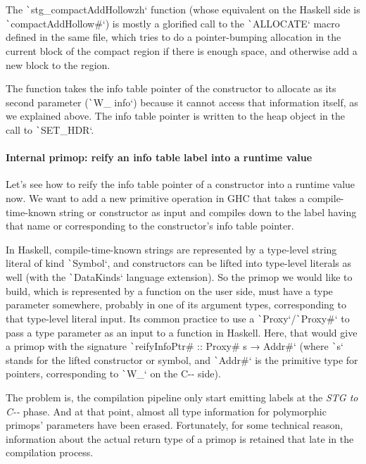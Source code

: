 \documentclass[english]{jflart}
\begin{document}
The \texttt`stg_compactAddHollowzh` function (whose equivalent on the Haskell side is \texttt`compactAddHollow#`) is mostly a glorified call to the \texttt`ALLOCATE` macro defined in the same file, which tries to do a pointer-bumping allocation in the current block of the compact region if there is enough space, and otherwise add a new block to the region.

The function takes the info table pointer of the constructor to allocate as its second parameter (\texttt`W_ info`) because it cannot access that information itself, as we explained above. The info table pointer is written to the heap object in the call to \texttt`SET_HDR`.

\paragraph{Internal primop: reify an info table label into a runtime value}

Let's see how to reify the info table pointer of a constructor into a runtime value now. We want to add a new primitive operation in GHC that takes a compile-time-known string or constructor as input and compiles down to the label having that name or corresponding to the constructor's info table pointer.

In Haskell, compile-time-known strings are represented by a type-level string literal of kind \texttt`Symbol`, and constructors can be lifted into type-level literals as well (with the \texttt`DataKinds` language extension). So the primop we would like to build, which is represented by a function on the user side, must have a type parameter somewhere, probably in one of its argument types, corresponding to that type-level literal input. Its common practice to use a \texttt`Proxy`/\texttt`Proxy#` to pass a type parameter as an input to a function in Haskell. Here, that would give a primop with the signature \texttt`reifyInfoPtr# :: Proxy# s → Addr#` (where \texttt`s` stands for the lifted constructor or symbol, and \texttt`Addr#` is the primitive type for pointers, corresponding to \texttt`W_` on the C-{}- side).

The problem is, the compilation pipeline only start emitting labels at the \emph{STG to C-{}-} phase. And at that point, almost all type information for polymorphic primops' parameters have been erased. Fortunately, for some technical reason, information about the actual return type of a primop is retained that late in the compilation process.
\end{document}
